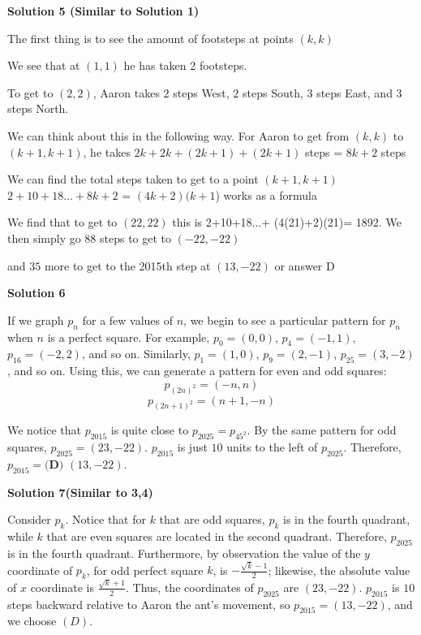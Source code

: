 \begin{enumerate}
 



\textbf{Solution 5 (Similar to Solution 1)}

The first thing is to see the amount of footsteps at points $(k,k)$

 We see that at $(1,1)$ he has taken 2 footsteps.

 To get to $(2,2)$, Aaron takes $2$ steps West, $2$ steps South, $3$ steps East, and $3$ steps North.

 We can think about this in the following way. For Aaron to get from $(k,k)$ to $(k+1,k+1)$, he takes $2k+2k+(2k+1)+(2k+1)$ steps = $8k+2$ steps

 We can find the total steps taken to get to a point $(k+1,k+1)$
$2+10+18... +8k+2$ = $(4k+2)(k+1$) works as a formula

 We find that to get to $(22,22)$ this is 2+10+18...+ (4(21)+2)(21)= 1892. We then simply go $88$ steps to get to $(-22,-22)$ 

 and $35$ more to get to the 2015th step at $(13,-22)$ or answer D

 



\textbf{Solution 6}

If we graph $p_n$ for a few values of $n$, we begin to see a particular pattern for $p_n$ when $n$ is a perfect square. For example, $p_0=(0,0)$, $p_4=(-1,1)$, $p_{16}=(-2, 2)$, and so on. Similarly, $p_1=(1,0)$, $p_9=(2,-1)$, $p_{25}=(3,-2)$, and so on. Using this, we can generate a pattern for even and odd squares: 
 \[p_{(2n)^2}=(-n, n)\] 
 \[p_{(2n+1)^2}=(n+1,-n)\]

 We notice that $p_{2015}$ is quite close to $p_{2025}=p_{45^2}$. By the same pattern for odd squares, $p_{2025}=(23,-22)$. $p_{2015}$ is just $10$ units to the left of $p_{2025}$. Therefore, $p_{2015}=\boxed{\textbf{(D) }(13,-22)}$.

 



\textbf{Solution 7(Similar to 3,4)}

Consider $p_k$. Notice that for $k$ that are odd squares, $p_k$ is in the fourth quadrant, while $k$ that are even squares are located in the second quadrant. Therefore, $p_{2025}$ is in the fourth quadrant. Furthermore, by observation the value of the $y$ coordinate of $p_{k}$, for odd perfect square $k$, is $- \frac{ \sqrt{k} -1}{2}$; likewise, the absolute value of $x$ coordinate is $\frac{ \sqrt{k} +1}{2}$. Thus, the coordinates of $p_{2025}$ are $(23,-22)$. $p_{2015}$ is $10$ steps backward relative to Aaron the ant's movement, so $p_{2015} = (13,-22)$, and we choose $\boxed{ (D) }$. 


\end{enumerate}
